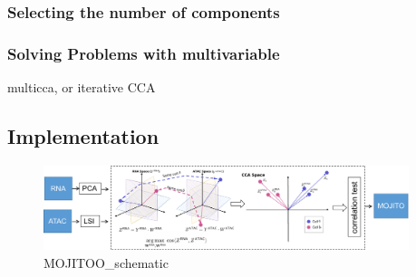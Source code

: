 \subsubsection{Selecting the number of components}


\subsubsection{Solving Problems with multivariable}

multicca, or iterative CCA

\subsection{Implementation}

\begin{figure}[!ht]
	\centering
	\includegraphics[width=0.95\textwidth]{MOJITOO_schematic/fig}
	\vspace{0.1cm}
	\caption[MOJITOO\_schematic.]{MOJITOO\_schematic}
	\label{fig:MOJITOO_schematic}
\end{figure}


